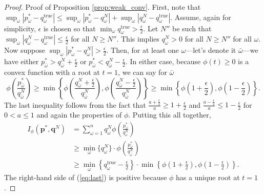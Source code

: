\documentclass[opre,nonblindrev]{informs3} %
\newcommand{\q}{\mathbf{q}}
\newcommand{\p}{\mathbf{p}}
\newcommand{\ob}{\bar{\omega}}
\begin{document}
\begin{proof}{\sc Proof of Proposition \ref{prop:weak_conv}.}
	First, note that $\sup_\omega |p_\omega^* - q^{\text{true}}_\omega| \leq \sup_\omega |p_\omega^* - q^N_\omega| + \sup_\omega |q^N_\omega - q^{\text{true}}_\omega|$.
	Assume, again for simplicity, $\epsilon$ is chosen so that $\min_{\omega} q^{\text{true}}_\omega > \frac{\epsilon}{2}$.
	Let $N''$ be such that $\sup_\omega |q^N_\omega - q^{\text{true}}_\omega| \leq \frac{\epsilon}{2}$ for all $N \geq N''$.
	This implies $q^N_\omega>0$ for all $N \geq N''$ for all $\omega$.
	Now suppose  $\sup_\omega |p_\omega^* - q^N_\omega| > \frac{\epsilon}{2}$. 
	Then, for at least one $\omega$---let's denote it $\ob$---we have either $p_{\ob}^* >q_{\ob}^N + \frac{\epsilon}{2}$ or $p_{\ob}^* < q_{\ob}^N - \frac{\epsilon}{2}$.
	In either case, because $\phi(t)\geq 0$ is a convex function with a root at $t=1$, we can say for $\ob$ 
$$
\phi \left( \frac{p_{\ob}^*}{q^N_{\ob}} \right) \geq \min\left\{ \phi\left( \frac{q^N_{\ob}+\tfrac{\epsilon}{2}}{q^N_{\ob}} \right), \phi\left( \frac{q^N_{\ob}-\tfrac{\epsilon}{2}}{q^N_{\ob}} \right) \right\} \geq \min\left\{ \phi\left( 1+\frac{\epsilon}{2}\right), \phi\left( 1-\frac{\epsilon}{2}\right) \right\}. 
$$  
	The last inequality follows from the fact that $\frac{a+\frac{\epsilon}{2}}{a} \geq 1+ \frac{\epsilon}{2}$ and $\frac{a-\frac{\epsilon}{2}}{a} \leq 1- \frac{\epsilon}{2}$ for $0<a\leq 1$ and again the properties of $\phi$. 
	Putting this all together, 
	\begin{align}
		I_{\phi}(\p^*,\q^N) & = \sum_{\omega=1}^n q^N_\omega \phi\left( \frac{p_\omega^*}{q^N_\omega} \right) \nonumber \\
		& \geq  \min_{\omega} \{q^N_\omega\} \cdot  \phi \left( \frac{p_{\ob}^*}{q^N_{\ob}} \right)  \nonumber \\
		& \geq  \min_{\omega} \left\{ q^{\text{true}}_\omega - \frac{\epsilon}{2} \right\} \cdot \min\left\{ \phi\left(1+\frac{\epsilon}{2}\right), \phi\left(1-\frac{\epsilon}{2}\right) \right\} \label{eq:last}.
	\end{align}
	The right-hand side of (\ref{eq:last}) is positive because $\phi$ has a unique root at $t=1$. 

\end{proof}
\end{document}
